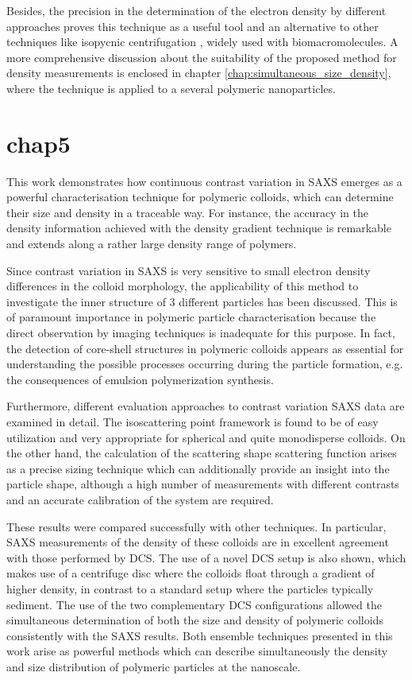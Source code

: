 Besides, the precision in the determination of the electron density by different approaches proves this technique as a useful tool and an alternative to other techniques like isopycnic centrifugation \citep{vauthier_measurement_1999,arnold_sorting_2006,sun_separation_2009}, widely used with biomacromolecules. A more comprehensive discussion about the suitability of the proposed method for density measurements is enclosed in chapter \ref{chap:simultaneous_size_density}, where the technique is applied to a several polymeric nanoparticles.

\section{chap5}

This work demonstrates how continuous contrast variation in SAXS emerges as a powerful characterisation technique for polymeric colloids, which can determine their size and density in a traceable way. For instance, the accuracy in the density information achieved with the density gradient technique is remarkable and extends along a rather large density range of polymers.

Since contrast variation in SAXS is very sensitive to small electron density differences in the colloid morphology, the applicability of this method to investigate the inner structure of 3 different particles has been discussed. This is of paramount importance in polymeric particle characterisation because the direct observation by imaging techniques is inadequate for this purpose. In fact, the detection of core-shell structures in polymeric colloids appears as essential for understanding the possible processes occurring during the particle formation, e.g. the consequences of emulsion polymerization synthesis. 

Furthermore, different evaluation approaches to contrast variation SAXS data are examined in detail. The isoscattering point framework is found to be of easy utilization and very appropriate for spherical and quite monodisperse colloids. On the other hand, the calculation of the scattering shape scattering function arises as a precise sizing technique which can additionally provide an insight into the particle shape, although a high number of measurements with different contrasts and an accurate calibration of the system are required.

These results were compared successfully with other techniques. In particular, SAXS measurements of the density of these colloids are in excellent agreement with those performed by DCS. The use of a novel DCS setup is also shown, which makes use of a centrifuge disc where the colloids float through a gradient of higher density, in contrast to a standard setup where the particles typically sediment. The use of the two complementary DCS configurations allowed the simultaneous determination of both the size and density of polymeric colloids consistently with the SAXS results. Both ensemble techniques presented in this work arise as powerful methods which can describe simultaneously the density and size distribution of polymeric particles at the nanoscale.

